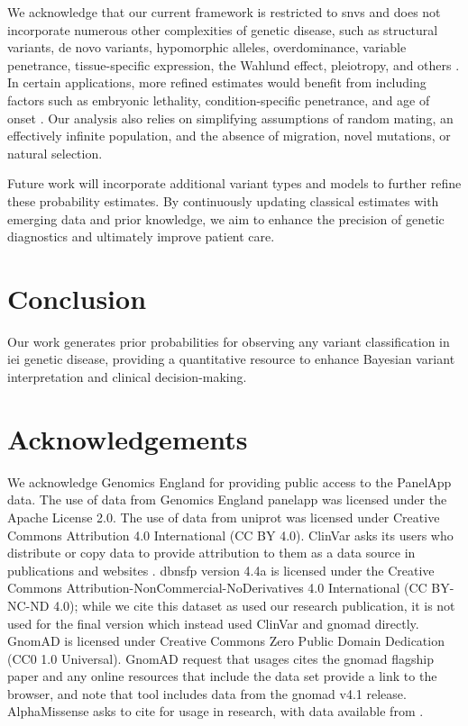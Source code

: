 We acknowledge that our current framework is restricted to \ac{snv}s and does not incorporate numerous other complexities of genetic disease, such as structural variants, de novo variants, hypomorphic alleles, overdominance, variable penetrance, tissue-specific expression, the Wahlund effect, pleiotropy, and others \cite{zschocke_mendelian_2023}. In certain applications, more refined estimates would benefit from including factors such as embryonic lethality, condition-specific penetrance, and age of onset \cite{hannah_using_2024}. Our analysis also relies on simplifying assumptions of random mating, an effectively infinite population, and the absence of migration, novel mutations, or natural selection.

Future work will incorporate additional variant types and models to further refine these probability estimates. By continuously updating classical estimates with emerging data and prior knowledge, we aim to enhance the precision of genetic diagnostics and ultimately improve patient care.







\section{Conclusion}
Our work generates prior probabilities for observing any variant classification in \ac{iei} genetic disease, providing a quantitative resource to enhance Bayesian variant interpretation and clinical decision-making.

\section*{Acknowledgements}
\noindent
We acknowledge Genomics England for providing public access to the PanelApp data.
The use of data from Genomics England panelapp was licensed under the Apache License 2.0.
The use of data from \ac{uniprot} was licensed under Creative Commons Attribution 4.0 International (CC BY 4.0).
ClinVar asks its users who distribute or copy data to provide attribution to them as a data source in publications and websites \cite{landrum_clinvar_2018}.
\ac{dbnsfp} version 4.4a is licensed under the Creative Commons Attribution-NonCommercial-NoDerivatives 4.0 International (CC BY-NC-ND 4.0); while we cite this dataset as used our research publication, it is not used for the final version which instead used ClinVar and \ac{gnomad} directly.
GnomAD is licensed under  Creative Commons  Zero Public Domain Dedication (CC0 1.0 Universal).
GnomAD request that usages cites the \ac{gnomad} flagship paper \cite{karczewski2020mutational}
and any online resources that include the data set provide a link to the browser, and note that tool includes data from the \ac{gnomad} v4.1 release.
AlphaMissense asks to cite \citet{cheng_accurate_2023} for usage in research, with data available from \citet{jun_cheng_2023_8208688}.

